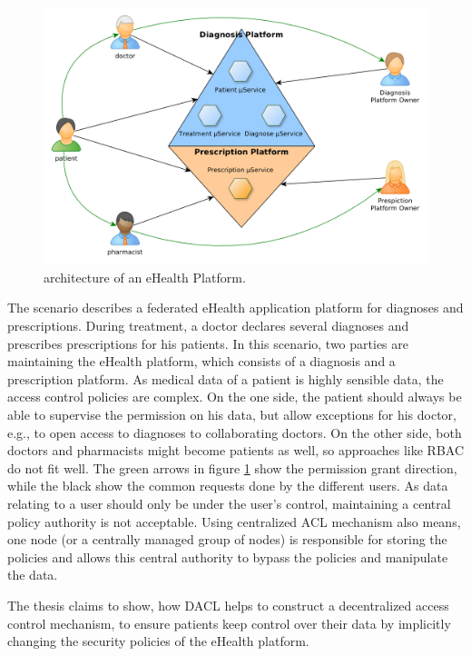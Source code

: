 \documentclass[12pt, conference]{IEEEtran}
\begin{document}
\begin{figure}[!h]
\centering
  \includegraphics[width=\linewidth]{figures/platform.png}
  \caption{architecture of an eHealth Platform.}
  \label{fig:platform}
\end{figure}

The scenario describes a federated eHealth application platform for diagnoses and prescriptions. During treatment, a doctor declares several diagnoses and prescribes prescriptions for his patients. In this scenario, two parties are maintaining the eHealth platform, which consists of a diagnosis and a prescription platform. As medical data of a patient is highly sensible data, the access control policies are complex. On the one side, the patient should always be able to supervise the permission on his data, but allow exceptions for his doctor, e.g., to open access to diagnoses to collaborating doctors. On the other side, both doctors and pharmacists might become patients as well, so approaches like RBAC do not fit well. The green arrows in figure \ref{fig:platform} show the permission grant direction, while the black show the common requests done by the different users. As data relating to a user should only be under the user's control, maintaining a central policy authority is not acceptable. Using centralized ACL mechanism also means, one node (or a centrally managed group of nodes) is responsible for storing the policies and allows this central authority to bypass the policies and manipulate the data.

The thesis claims to show, how DACL helps to construct a decentralized access control mechanism, to ensure patients keep control over their data by implicitly changing the security policies of the eHealth platform.
\end{document}
